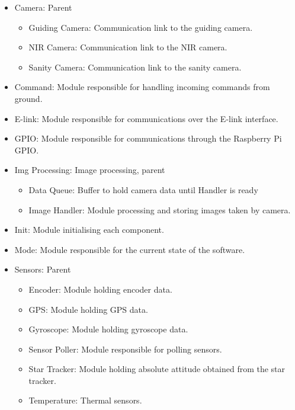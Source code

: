 \begin{itemize}

	\item Camera: Parent
		\begin{itemize}
			\item Guiding Camera: Communication link to the guiding camera.
			\item NIR Camera: Communication link to the NIR camera.
			\item Sanity Camera: Communication link to the sanity camera.
		\end{itemize}

	\item Command: Module responsible for handling incoming commands from ground.

	\item E-link: Module responsible for communications over the E-link interface.

    \item GPIO: Module responsible for communications through the Raspberry Pi GPIO.

	\item Img Processing: Image processing, parent
		\begin{itemize}
			\item Data Queue: Buffer to hold camera data until Handler is ready
			\item Image Handler: Module processing and storing images taken by camera.
		\end{itemize}

	\item Init: Module initialising each component.

	\item Mode: Module responsible for the current state of the software.

	\item Sensors: Parent
		\begin{itemize}
            \item Encoder: Module holding encoder data.
            \item GPS: Module holding GPS data.
            \item Gyroscope: Module holding gyroscope data.
			 \item Sensor Poller: Module responsible for polling sensors.
            \item Star Tracker: Module holding absolute attitude obtained from the star tracker.
			\item Temperature: Thermal sensors.
		\end{itemize}


\end{itemize}
